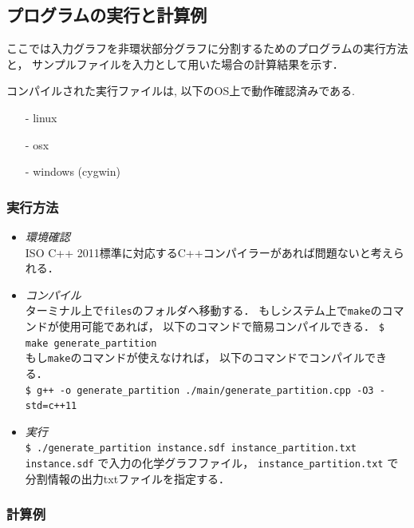 \documentclass[11pt,titlepage,dvipdfmx,twoside]{jsbook}
\begin{document}

\subsection{プログラムの実行と計算例}
\label{chap:Example_p}

ここでは入力グラフを非環状部分グラフに分割するためのプログラムの実行方法と，
サンプルファイルを入力として用いた場合の計算結果を示す．

コンパイルされた実行ファイルは, 以下のOS上で動作確認済みである.
\begin{itemize}
\item[-] linux
\item[-] osx 
\item[-] windows (cygwin)
\end{itemize}

\subsubsection{実行方法}
\label{chap:compile_p}
\begin{itemize}
	\item {\em 環境確認}\\
		ISO C++ 2011標準に対応するC++コンパイラーがあれば問題ないと考えられる．
	\item {\em コンパイル}\\
	      ターミナル上で{\tt files}のフォルダへ移動する．
	      もしシステム上で{\tt make}のコマンドが使用可能であれば，
	      以下のコマンドで簡易コンパイルできる．
	      \verb|$ make generate_partition|\\
	      もし{\tt make}のコマンドが使えなければ，
	      以下のコマンドでコンパイルできる． \\	
		\verb|$ g++ -o generate_partition ./main/generate_partition.cpp -O3 -std=c++11|
	\item {\em 実行}\\
		\verb|$ ./generate_partition instance.sdf instance_partition.txt|\\
		\verb|instance.sdf| で入力の化学グラフファイル，
	  \verb|instance_partition.txt| で分割情報の出力txtファイルを指定する．
\end{itemize}


\subsubsection{計算例}
\label{chap:instance_p}
\end{document}
